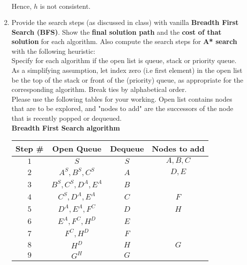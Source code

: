 \begin{enumerate}
\begin{align*}
        \end{align*}
        Hence, $h$ is not consistent.
  \item Provide the search steps (as discussed in class) with vanilla \textbf{Breadth First Search (BFS)}. Show the \textbf{final solution path} and the \textbf{cost of that solution} for each algorithm. Also compute the search steps for \textbf{A* search} with the following heuristic:\\[10pt]
        Specify for each algorithm if the open list is queue, stack or priority queue. As a simplifying assumption, let index zero (i.e first element) in the open list be the top of the stack or front of the (priority) queue, as appropriate for the corresponding algorithm. Break ties by alphabetical order.\\
        Please use the following tables for your working. Open list contains nodes that are to be explored, and "nodes to add" are the successors of the node that is recently popped or dequeued.\\[10pt]
        \textbf{Breadth First Search algorithm}
        \begin{center}
          \bgroup
          \def\arraystretch{1.5}%
          \begin{tabular}{|c|c|c|c|}
            \hline
            Step \# & Open Queue           & Dequeue & Nodes to add \\
            \hline
            $1$     & $S$                  & $S$     & $A,B,C$      \\
            $2$     & $A^S, B^S, C^S$      & $A$     & $D,E$        \\
            $3$     & $B^S, C^S, D^A, E^A$ & $B$     &              \\
            $4$     & $C^S, D^A, E^A$      & $C$     & $F$          \\
            $5$     & $D^A, E^A, F^C$      & $D$     & $H$          \\
            $6$     & $E^A, F^C, H^D$      & $E$     &              \\
            $7$     & $F^C, H^D$           & $F$     &              \\
            $8$     & $H^D$                & $H$     & $G$          \\
            $9$     & $G^H$                & $G$     &              \\
            \hline
          \end{tabular}
          \egroup
        \end{center}

\end{enumerate}

